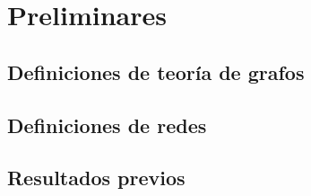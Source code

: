\chapter{Preliminares}

\section{Definiciones de teoría de grafos}

\section{Definiciones de redes}

\section{Resultados previos}